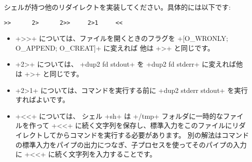 \begin{exercise}
シェルが持つ他のリダイレクトを実装してください。具体的には以下です:
%
\begin{lstlisting}
>>      2>      2>>     2>1     <<
\end{lstlisting}
%
\end{exercise}
\begin{answer}
\begin{itemize}
\item \ml+>>+ については、ファイルを開くときのフラグを \ml+[O_WRONLY; O_APPEND; O_CREAT]+ に変えれば
  他は \ml+>+ と同じです。
%
\item \ml+2>+ については、 \ml+dup2 fd stdout+ を \ml+dup2 fd stderr+ に変えれば他は \ml+>+ と同じです。
%
\item \ml+2>1+ については、コマンドを実行する前に \ml+dup2 stderr stdout+ を実行すればよいです。
%
\item \ml+<<+ については、 シェル \ml+sh+ は \ml+/tmp+ フォルダに一時的なファイルを作って
  \ml+<<+ に続く文字列を保存し、標準入力をこのファイルにリダイレクトしてからコマンドを実行する必要があります。
  別の解法はコマンドの標準入力をパイプの出力につなぎ、子プロセスを使ってそのパイプの入力に \ml+<<+ に続く文字列を入力することです。

\end{itemize}
\end{answer}

